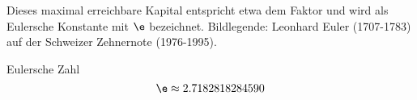 Dieses maximal erreichbare Kapital entspricht etwa dem Faktor  und
wird als Eulersche Konstante mit $\e$ bezeichnet.
\newpage
{}
Bildlegende: Leonhard Euler (1707-1783) auf der Schweizer Zehnernote (1976-1995).

\begin{definition}{Eulersche Zahl}{}
$$\e \approx 2.7182818284590$$
\end{definition}
\newpage
